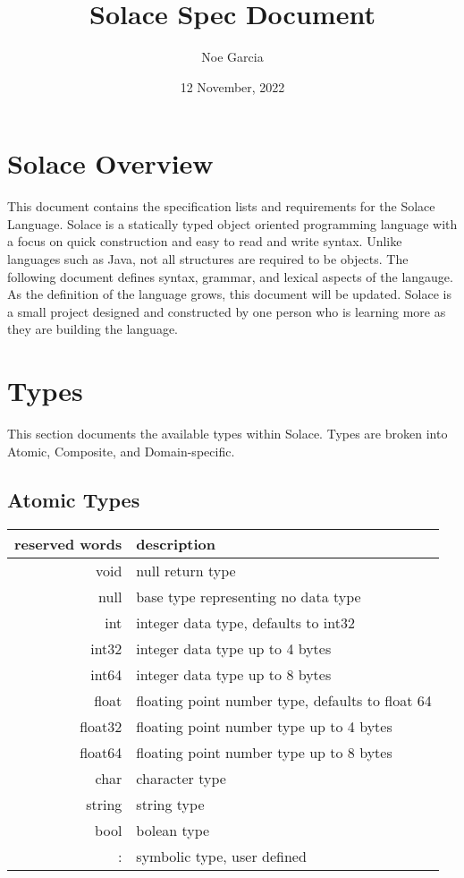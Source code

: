 \documentclass{article}
\title{
	\vspace{2in}
	\textmd{\textbf{Solace Spec Document}}
	\vspace{3in}
}
\author{Noe Garcia}
\date{12 November, 2022}
\begin{document}
\maketitle
\newpage

\section{Solace Overview}
This document contains the specification lists and requirements for the Solace Language.
Solace is a statically typed object oriented programming language with a focus on quick
construction and easy to read and write syntax. Unlike languages such as Java, not all
structures are required to be objects. The following document defines syntax, grammar, and
lexical aspects of the langauge. As the definition of the language grows, this document
will be updated.
Solace is a small project designed and constructed by one person who is learning more
as they are building the language.


\section{Types}
This section documents the available types within Solace. Types are broken into Atomic,
Composite, and Domain-specific.

\subsection{Atomic Types}
\begin{tabular}{r|l}
	reserved words & description \\
	\hline
	\hline
	void & null return type \\
	null & base type representing no data type \\
	int & integer data type, defaults to int32 \\
	int32 & integer data type up to 4 bytes \\
	int64 & integer data type up to 8 bytes \\
	float & floating point number type, defaults to float 64 \\
	float32 & floating point number type up to 4 bytes \\
	float64 & floating point number type up to 8 bytes \\
	char & character type \\
	string & string type \\
	bool & bolean type \\
	: & symbolic type, user defined
\end{tabular}
\end{document}
